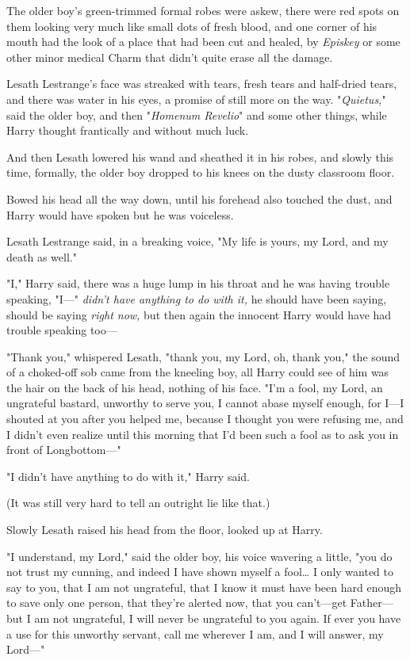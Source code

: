 The older boy's green-trimmed formal robes were askew, there were red spots on 
them looking very much like small dots of fresh blood, and one corner of his 
mouth had the look of a place that had been cut and healed, by \emph{Episkey} 
or some other minor medical Charm that didn't quite erase all the damage.

Lesath Lestrange's face was streaked with tears, fresh tears and half-dried 
tears, and there was water in his eyes, a promise of still more on the way. 
"\emph{Quietus,}" said the older boy, and then "\emph{Homenum Revelio}" and 
some other things, while Harry thought frantically and without much luck.

And then Lesath lowered his wand and sheathed it in his robes, and slowly this 
time, formally, the older boy dropped to his knees on the dusty classroom floor.

Bowed his head all the way down, until his forehead also touched the dust, and 
Harry would have spoken but he was voiceless.

Lesath Lestrange said, in a breaking voice, "My life is yours, my Lord, and my 
death as well."

"I," Harry said, there was a huge lump in his throat and he was having trouble 
speaking, "I---" \emph{didn't have anything to do with it,} he should have been 
saying, should be saying \emph{right now,} but then again the innocent Harry 
would have had trouble speaking too---

"Thank you," whispered Lesath, "thank you, my Lord, oh, thank you," the sound 
of a choked-off sob came from the kneeling boy, all Harry could see of him was 
the hair on the back of his head, nothing of his face. "I'm a fool, my Lord, an 
ungrateful bastard, unworthy to serve you, I cannot abase myself enough, for 
I---I shouted at you after you helped me, because I thought you were refusing 
me, and I didn't even realize until this morning that I'd been such a fool as 
to ask you in front of Longbottom---"

"I didn't have anything to do with it," Harry said.

(It was still very hard to tell an outright lie like that.)

Slowly Lesath raised his head from the floor, looked up at Harry.

"I understand, my Lord," said the older boy, his voice wavering a little, "you 
do not trust my cunning, and indeed I have shown myself a fool{\ldots} I only 
wanted to say to you, that I am not ungrateful, that I know it must have been 
hard enough to save only one person, that they're alerted now, that you 
can't---get Father---but I am not ungrateful, I will never be ungrateful to you 
again. If ever you have a use for this unworthy servant, call me wherever I am, 
and I will answer, my Lord---"

